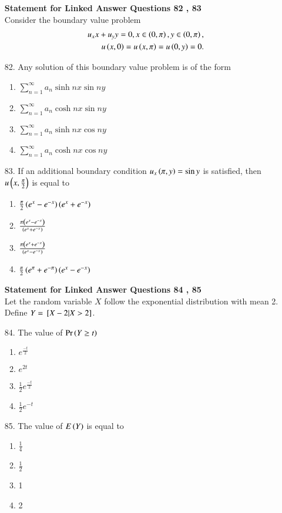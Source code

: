 \documentclass[journal,12pt,onecolumn]{IEEEtran}
\theoremstyle{remark}
\begin{document}
\begin{enumerate}
\textbf{Statement for Linked Answer Questions 82 , 83}\\
Consider the boundary value problem
\begin{align}
    u_xx + u_yy = 0, x \in \left(0, \pi\right), y \in \left(0, \pi\right), \\
    u\left(x, 0\right) = u\left(x, \pi\right) = u\left(0, y\right) = 0.
\end{align}
\item[82.] Any solution of this boundary value problem is of the form
		\hfill{}
		\begin{enumerate}
            \item $\sum_{n = 1}^{\infty} a_n \sinh nx \sin ny$ 
            \item $\sum_{n = 1}^{\infty} a_n \cosh nx \sin ny$ 
			\item $\sum_{n = 1}^{\infty} a_n \sinh nx \cos ny$ 
		\item $\sum_{n = 1}^{\infty} a_n \cosh nx \cos ny$ 
		\end{enumerate}
\item[83.] If an additional boundary condition $u_x\left(\pi, y\right) = \sin y$ is satisfied, then 
    $u\left(x, \frac{\pi}{2}\right)$ is equal to
		\hfill{}
		\begin{enumerate}
            \item $\frac{\pi}{2}\left(e^x - e^{-x}\right)\left(e^x + e^{-x}\right)$ 
            \item $\frac{\pi\left(e^x - e^{-x}\right)}{\left(e^x + e^{-x}\right)}$ 
            \item $\frac{\pi\left(e^x + e^{-x}\right)}{\left(e^x - e^{-x}\right)}$ 
            \item $\frac{\pi}{2}\left(e^{\pi} + e^{-\pi}\right)\left(e^x - e^{-x}\right)$ 
		\end{enumerate}
\textbf{Statement for Linked Answer Questions 84 , 85}\\
Let the random variable $X$ follow the exponential distribution with mean 2. Define
$Y = {}\left[X - 2 | X > 2\right]$.
\item[84.] The value of $\Pr{\ensuremath{\left(Y \ge t\right)}}$
		\hfill{}
		\begin{enumerate}
            \item $e ^ {\frac{-t}{2}}$ 
            \item $e ^ {2t}$ 
            \item $\frac{1}{2}e ^ {\frac{-t}{2}}$ 
            \item $\frac{1}{2}e ^ {-t}$ 
		\end{enumerate}
\item[85.] The value of $E\left(Y\right)$ is equal to
		\hfill{}
		\begin{enumerate}
            \item $\frac{1}{4}$ 
            \item $\frac{1}{2}$ 
            \item 1
            \item 2
		\end{enumerate}

\end{enumerate}
\end{document}
